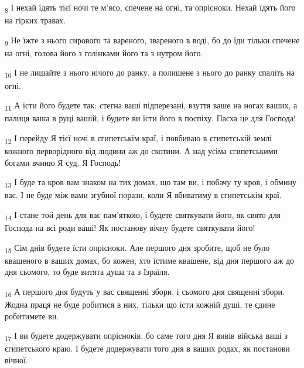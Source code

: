 \begin{tcolorbox}
\textsubscript{8} І нехай їдять тієї ночі те м'ясо, спечене на огні, та опрісноки. Нехай їдять його на гірких травах.
\end{tcolorbox}
\begin{tcolorbox}
\textsubscript{9} Не їжте з нього сирового та вареного, звареного в воді, бо до їди тільки спечене на огні, голова його з голінками його та з нутром його.
\end{tcolorbox}
\begin{tcolorbox}
\textsubscript{10} І не лишайте з нього нічого до ранку, а полишене з нього до ранку спаліть на огні.
\end{tcolorbox}
\begin{tcolorbox}
\textsubscript{11} А їсти його будете так: стегна ваші підперезані, взуття ваше на ногах ваших, а палиця ваша в руці вашій, і будете ви їсти його в поспіху. Пасха це для Господа!
\end{tcolorbox}
\begin{tcolorbox}
\textsubscript{12} І перейду Я тієї ночі в єгипетськім краї, і повбиваю в єгипетській землі кожного перворідного від людини аж до скотини. А над усіма єгипетськими богами вчиню Я суд. Я Господь!
\end{tcolorbox}
\begin{tcolorbox}
\textsubscript{13} І буде та кров вам знаком на тих домах, що там ви, і побачу ту кров, і обмину вас. І не буде між вами згубної порази, коли Я вбиватиму в єгипетськім краї.
\end{tcolorbox}
\begin{tcolorbox}
\textsubscript{14} І стане той день для вас пам'яткою, і будете святкувати його, як свято для Господа на всі роди ваші! Як постанову вічну будете святкувати його!
\end{tcolorbox}
\begin{tcolorbox}
\textsubscript{15} Сім днів будете їсти опрісноки. Але першого дня зробите, щоб не було квашеного в ваших домах, бо кожен, хто їстиме квашене, від дня першого аж до дня сьомого, то буде витята душа та з Ізраїля.
\end{tcolorbox}
\begin{tcolorbox}
\textsubscript{16} А першого дня будуть у вас священні збори, і сьомого дня священні збори. Жодна праця не буде робитися в них, тільки що їсти кожній душі, те єдине робитимете ви.
\end{tcolorbox}
\begin{tcolorbox}
\textsubscript{17} І ви будете додержувати опрісноків, бо саме того дня Я вивів війська ваші з єгипетського краю. І будете додержувати того дня в ваших родах, як постанови вічної.
\end{tcolorbox}
